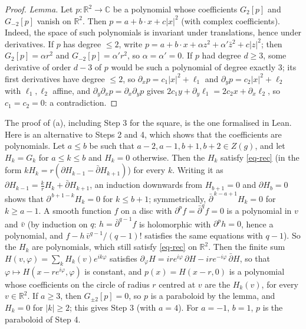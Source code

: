 \documentclass[a4paper,11pt,twoside,leqno]{article}
\newcommand{\rr}[0]{\ensuremath{\mathbb{R}}}
\numberwithin{equation}{section}
\begin{document}
\begin{proof}
\emph{Lemma.} Let $p : \rr^2 \to \mathbb{C}$ be a polynomial whose coefficients $G_2[p]$ and $G_{-2}[p]$ vanish on $\rr^2$. Then $p = a + b \cdot x + c|x|^2$ (with complex coefficients). Indeed, the space of such polynomials is invariant under translations, hence under derivatives. If $p$ has degree $\leq 2$, write $p = a + b \cdot x + \alpha z^2 + \alpha' \bar z^2 + c|z|^2$; then $G_2[p] = \alpha r^2$ and $G_{-2}[p] = \alpha' r^2$, so $\alpha = \alpha' = 0$. If $p$ had degree $d \geq 3$, some derivative of order $d-3$ of $p$ would be such a polynomial of degree exactly $3$; its first derivatives have degree $\leq 2$, so $\partial_x p = c_1 |x|^2 + \ell_1$ and $\partial_y p = c_2|x|^2 + \ell_2$ with $\ell_1, \ell_2$ affine, and $\partial_y \partial_x p = \partial_x \partial_y p$ gives $2c_1 y + \partial_y \ell_1 = 2 c_2 x + \partial_x \ell_2$, so $c_1 = c_2 = 0$: a contradiction.
\end{proof}

The proof of (a), including Step 3 for the square, is the one formalised in Lean. Here is an alternative to Steps 2 and 4, which shows that the coefficients are polynomials. Let $a \leq b$ be such that $a-2, a-1, b+1, b+2 \in Z(g)$, and let $H_k = G_k$ for $a \leq k \leq b$ and $H_k = 0$ otherwise. Then the $H_k$ satisfy \eqref{eq-rec} (in the form $k H_k = r(\partial H_{k-1} - \bar\partial H_{k+1})$) for every $k$. Writing it as $\partial H_{k-1} = \frac{k}{r} H_k + \bar\partial H_{k+1}$, an induction downwards from $H_{b+1} = 0$ and $\partial H_b = 0$ shows that $\partial^{\,b+1-k} H_k = 0$ for $k \leq b+1$; symmetrically, $\bar\partial^{\,k-a+1} H_k = 0$ for $k \geq a-1$. A smooth function $f$ on a disc with $\partial^p f = \bar\partial^q f = 0$ is a polynomial in $v$ and $\bar v$ (by induction on $q$: $h = \bar\partial^{q-1} f$ is holomorphic with $\partial^p h = 0$, hence a polynomial, and $f - h\, \bar v^{q-1}/(q-1)!$ satisfies the same equations with $q-1$). So the $H_k$ are polynomials, which still satisfy \eqref{eq-rec} on $\rr^2$. Then the finite sum $H(v, \varphi) = \sum_k H_k(v) e^{ik\varphi}$ satisfies $\partial_\varphi H = ir e^{i\varphi}\, \partial H - ir e^{-i\varphi}\, \bar\partial H$, so that $\varphi \mapsto H(x - re^{i\varphi}, \varphi)$ is constant, and $p(x) = H(x - r, 0)$ is a polynomial whose coefficients on the circle of radius $r$ centred at $v$ are the $H_k(v)$, for every $v \in \rr^2$. If $a \geq 3$, then $G_{\pm 2}[p] = 0$, so $p$ is a paraboloid by the lemma, and $H_k = 0$ for $|k| \geq 2$; this gives Step 3 (with $a = 4$). For $a = -1$, $b = 1$, $p$ is the paraboloid of Step 4.
\end{document}
